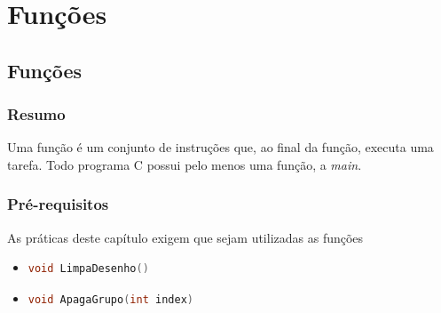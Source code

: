 
\part[Subalgoritmos]
{Funções}


\chapter[Subalgoritmos]
{Funções}



\section*{Resumo}

Uma função é um conjunto de instruções que, ao final da função, executa uma tarefa. Todo programa C possui pelo menos uma função, a \emph{main}.

%
%







\section*{Pré-requisitos}

As práticas deste capítulo exigem que sejam utilizadas as funções
\begin{itemize}
  \item 
    \begin{lstlisting}[language=C++]
    void LimpaDesenho()
    \end{lstlisting}

  \item 
    \begin{lstlisting}[language=C++]
    void ApagaGrupo(int index)
    \end{lstlisting}
 
 
\end{itemize}

